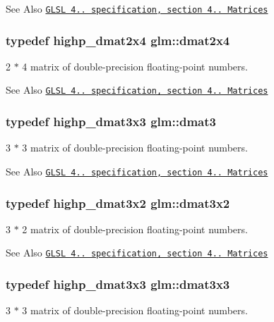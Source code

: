 \begin{DoxySeeAlso}{See Also}
\href{http://www.opengl.org/registry/doc/GLSLangSpec.4.20.8.pdf}{\tt G\-L\-S\-L 4.. specification, section 4.. Matrices} 
\end{DoxySeeAlso}
\hypertarget{group__core__types_ga2d1dd4b4925d1ea67539902c820483a0}{
\subsubsection[{dmat2x4}]{\setlength{\rightskip}{0pt plus 5cm}typedef highp\-\_\-dmat2x4 {\bf glm\-::dmat2x4}}}\label{group__core__types_ga2d1dd4b4925d1ea67539902c820483a0}
2 $\ast$ 4 matrix of double-\/precision floating-\/point numbers.

\begin{DoxySeeAlso}{See Also}
\href{http://www.opengl.org/registry/doc/GLSLangSpec.4.20.8.pdf}{\tt G\-L\-S\-L 4.. specification, section 4.. Matrices} 
\end{DoxySeeAlso}
\hypertarget{group__core__types_ga25fd62195c3ef5ac0d32ead1dbfbb929}{
\subsubsection[{dmat3}]{\setlength{\rightskip}{0pt plus 5cm}typedef highp\-\_\-dmat3x3 {\bf glm\-::dmat3}}}\label{group__core__types_ga25fd62195c3ef5ac0d32ead1dbfbb929}
3 $\ast$ 3 matrix of double-\/precision floating-\/point numbers.

\begin{DoxySeeAlso}{See Also}
\href{http://www.opengl.org/registry/doc/GLSLangSpec.4.20.8.pdf}{\tt G\-L\-S\-L 4.. specification, section 4.. Matrices} 
\end{DoxySeeAlso}
\hypertarget{group__core__types_ga2db259d2e7921065c5b7d4dca9547960}{
\subsubsection[{dmat3x2}]{\setlength{\rightskip}{0pt plus 5cm}typedef highp\-\_\-dmat3x2 {\bf glm\-::dmat3x2}}}\label{group__core__types_ga2db259d2e7921065c5b7d4dca9547960}
3 $\ast$ 2 matrix of double-\/precision floating-\/point numbers.

\begin{DoxySeeAlso}{See Also}
\href{http://www.opengl.org/registry/doc/GLSLangSpec.4.20.8.pdf}{\tt G\-L\-S\-L 4.. specification, section 4.. Matrices} 
\end{DoxySeeAlso}
\hypertarget{group__core__types_gaf3c29c4f75a448f308463e75ca2efd4c}{
\subsubsection[{dmat3x3}]{\setlength{\rightskip}{0pt plus 5cm}typedef highp\-\_\-dmat3x3 {\bf glm\-::dmat3x3}}}\label{group__core__types_gaf3c29c4f75a448f308463e75ca2efd4c}
3 $\ast$ 3 matrix of double-\/precision floating-\/point numbers.

